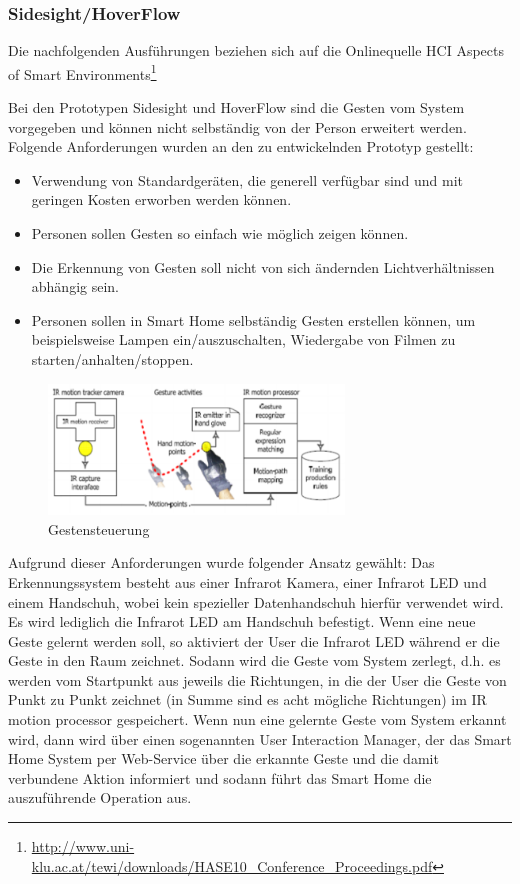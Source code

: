 \subsubsection{Sidesight/HoverFlow}

Die nachfolgenden Ausführungen beziehen sich auf die Onlinequelle \glqq HCI Aspects of Smart Environments\grqq\footnote{\url{http://www.uni-klu.ac.at/tewi/downloads/HASE10_Conference_Proceedings.pdf}}

Bei den Prototypen Sidesight und HoverFlow sind die Gesten vom System vorgegeben und können
nicht selbständig von der Person erweitert werden. Folgende Anforderungen wurden an den zu
entwickelnden Prototyp gestellt:

\begin{itemize}
\item Verwendung von Standardgeräten, die generell verfügbar sind und mit geringen Kosten
erworben werden können.
\item Personen sollen Gesten so einfach wie möglich zeigen können.
\item Die Erkennung von Gesten soll nicht von sich ändernden Lichtverhältnissen abhängig sein.
\item Personen sollen in Smart Home selbständig Gesten erstellen können, um beispielsweise
Lampen ein/auszuschalten, Wiedergabe von Filmen zu starten/anhalten/stoppen.
\end{itemize}

\begin{figure}[h!]
	\centering
	\includegraphics[width=0.7\textwidth]{img/Feedback-Mechanismen/Gestensteuerung.png}
	\caption{Gestensteuerung}
	\label{fig:feedbackGestensteuerung}
\end{figure}

Aufgrund dieser Anforderungen wurde folgender Ansatz gewählt: Das Erkennungssystem besteht aus einer Infrarot Kamera, einer Infrarot LED und einem Handschuh, wobei kein spezieller Datenhandschuh hierfür verwendet wird. Es wird lediglich die Infrarot LED am Handschuh befestigt. Wenn eine neue Geste gelernt werden soll, so aktiviert der User die Infrarot LED während er die Geste in den Raum zeichnet. Sodann wird die Geste vom System zerlegt, d.h. es werden vom Startpunkt aus jeweils die Richtungen, in die der User die Geste von Punkt zu Punkt zeichnet (in Summe sind es acht mögliche Richtungen) im IR motion processor gespeichert. Wenn nun eine gelernte Geste vom System erkannt wird, dann wird über einen sogenannten \glqq User Interaction Manager\grqq , der das Smart Home System per Web-Service über die erkannte Geste und die damit verbundene Aktion informiert und sodann führt das Smart Home die auszuführende Operation aus.

